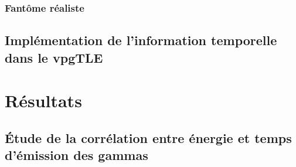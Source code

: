 \documentclass[11pt,a4paper,oldfontcommands]{memoir}
\begin{document}
\subsubsection{Fantôme réaliste}

\subsection{Implémentation de l'information temporelle dans le vpgTLE}


\section{Résultats}

\subsection{\'Etude de la corrélation entre énergie et temps d'émission des gammas}
\end{document}

